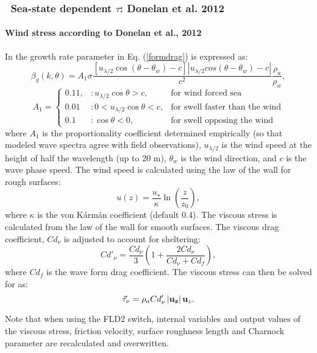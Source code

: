 \vsssub
\subsubsection{~Sea-state dependent $\tau$: Donelan et al. 2012} \label{sec:FLD2}
\vsssub


\paragraph{Wind stress according to Donelan et al., 2012}
In \citet{art:Don12} the growth rate parameter in Eq. (\ref{formdrag}) is expressed as:
\begin{equation}
\beta_g(k,\theta)=A_1 \sigma \frac{\left[u_{\lambda/2} \cos(\theta-\theta_w)-c\right]\left| u_{\lambda/2}cos(\theta-\theta_w)-c \right|}{c^2}\frac{\rho_a}{\rho_w},
\end{equation}
\begin{equation}
A_{1}=\left\{
\begin{array}{lll} 
0.11, & :  u_{\lambda/2}\cos\theta>c,  &\mbox{for wind forced sea}\\
0.01 & :   0<u_{\lambda/2}\cos\theta<c, &\mbox{for swell faster than the wind}\\
0.1 & :  \cos\theta<0,  &\mbox{for swell opposing the wind}
\end{array}
\right.
\end{equation}
where $A_1$ is the proportionality coefficient determined empirically (so that modeled wave spectra agree with field observations), $u_{\lambda/2}$ is the wind speed at the height of half the wavelength (up to 20 m), $\theta_w$ is the wind direction, and $c$ is the wave phase speed.
The wind speed is calculated using the law of the wall for rough surfaces:
\begin{equation}
u(z)=\frac{u_\star}{\kappa}\ln\left(\frac{z}{z_0}\right),
\end{equation}
where $\kappa$ is the von K\'arm\'an coefficient (default 0.4).
The viscous stress is calculated from the law of the wall for smooth surfaces.
The viscous drag coefficient, $Cd_\nu$ is adjusted to account for sheltering:
\begin{equation}
Cd'_\nu=\frac{Cd_\nu}{3}\left(1+\frac{2 Cd_\nu}{Cd_\nu+Cd_f}\right),
\end{equation}
where $Cd_f$ is the wave form drag coefficient.
The viscous stress can then be solved for as:
\begin{equation}
\vec{\tau}_\nu=\rho_a Cd'_\nu \left|{\bf u_{z}}\right|{\bf {u}}_{z}.
\end{equation}

Note that when using the FLD2 switch, internal variables and output values of the viscous stress, friction velocity, surface roughness length and Charnock parameter are recalculated and overwritten. 
